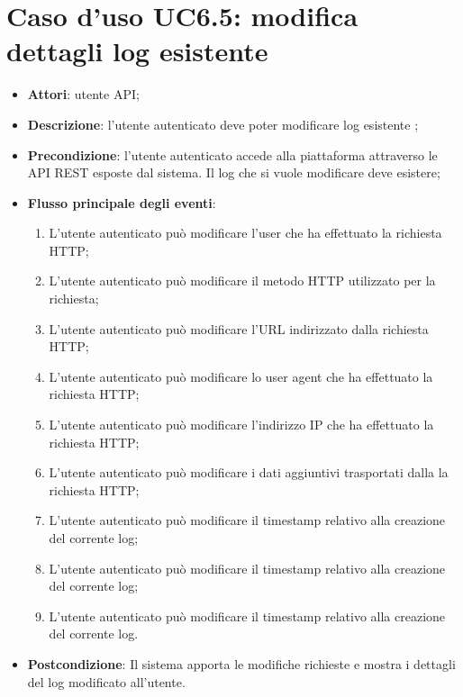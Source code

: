 \section{Caso d'uso UC6.5: modifica dettagli log esistente}
\begin{itemize}
\item \textbf{Attori}: utente API;
\item \textbf{Descrizione}: l'utente autenticato deve poter modificare log esistente ; 
      \item \textbf{Precondizione}: l'utente autenticato accede alla piattaforma attraverso le API REST esposte dal sistema. Il log che si vuole modificare deve esistere;

        \item \textbf{Flusso principale degli eventi}:
          \begin{enumerate}
          \item L'utente autenticato può modificare l'user che ha effettuato la richiesta HTTP;
          \item L'utente autenticato può modificare il metodo HTTP utilizzato per la richiesta;
          \item L'utente autenticato può modificare l'URL indirizzato dalla richiesta HTTP;
          \item L'utente autenticato può modificare lo user agent che ha effettuato la richiesta HTTP;
          \item L'utente autenticato può modificare l'indirizzo IP che ha effettuato la richiesta HTTP;
          \item L'utente autenticato può modificare i dati aggiuntivi trasportati dalla la richiesta HTTP;
          \item L'utente autenticato può modificare il timestamp relativo alla creazione del corrente log;
          \item L'utente autenticato può modificare il timestamp relativo alla creazione del corrente log;
          \item L'utente autenticato può modificare il timestamp relativo alla creazione del corrente log.

      \end{enumerate}
    \item \textbf{Postcondizione}: Il sistema apporta le modifiche richieste e mostra i dettagli del log modificato all'utente.
  \end{itemize}



